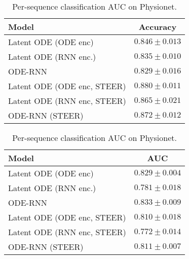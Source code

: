 \begin{table}
	\small{
		\parbox{.48\textwidth}{
			\centering
			\begin{tabular}{l c}
				\toprule
				\textbf{Model} & \textbf{Accuracy} \\ \midrule
				Latent ODE (ODE enc) & $0.846 \pm 0.013$ \\
				Latent ODE (RNN enc.) &  $0.835 \pm 0.010$ \\
				ODE-RNN &  $0.829 \pm 0.016$ \\
				\midrule
				Latent ODE (ODE enc, STEER) & $\mathbf{0.880 \pm 0.011}$ \\ 
				Latent ODE (RNN enc, STEER) & $0.865 \pm 0.021$ \\ 
				ODE-RNN (STEER) & $0.872 \pm 0.012$ \\ 
				\bottomrule %
			\end{tabular}
			\caption{Per-time-point classification accuracies on the Human Activity dataset.}
			\label{tab:latent_ode_human_activity}
		}
		\hfill
		\parbox{.48\textwidth}{
			\centering
			\begin{tabular}{l c}
				\toprule
				\textbf{Model} & \textbf{AUC} \\ \midrule
				Latent ODE (ODE enc) & $0.829 \pm 0.004$ \\
				Latent ODE (RNN enc.) &  $0.781 \pm 0.018$ \\
				ODE-RNN & $\mathbf{0.833 \pm 0.009}$ \\
				\midrule
				Latent ODE (ODE enc, STEER) & $0.810 \pm 0.018$ \\ 
				Latent ODE (RNN enc, STEER) & $0.772 \pm 0.014$ \\ 
				ODE-RNN (STEER) & $0.811 \pm 0.007$ \\ 
				\bottomrule %
			\end{tabular}
			\caption{Per-sequence classification AUC on Physionet.}
			\label{tab:latent_ode_physionet}
			
		}
	}
\end{table}

